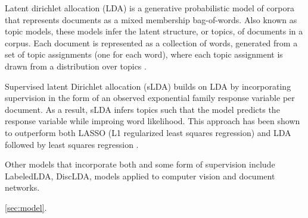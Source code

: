 Latent dirichlet allocation (LDA) is a generative
probabilistic model of corpora that represents documents as a mixed
membership bag-of-words. Also known as topic models, these models
infer the latent structure, or topics, of documents in a corpus. Each
document is represented as a collection of words, generated from a
set of topic assignments (one for each word), where each topic assignment
is drawn from a distribution over topics \citep{Blei2003}.

Supervised latent Dirichlet allocation (sLDA) builds on LDA by incorporating
supervision in the form of an observed exponential family response 
variable per document. As a result, sLDA
infers topics such that the model predicts the response variable while
improing word likelihood.  This approach has been shown to outperform both LASSO
(L1 regularized least squares regression) and LDA followed by least
squares regression \citep{BleiMcAuliffe2008}.

Other models that incorporate both and some form of supervision include
LabeledLDA\citep{Ramage2009}, DiscLDA\citep{DiscLDA}, models applied to 
computer vision and document networks\citep{wangbleifeifei08,RelationalLDA}. 

\ref{sec:model}.

